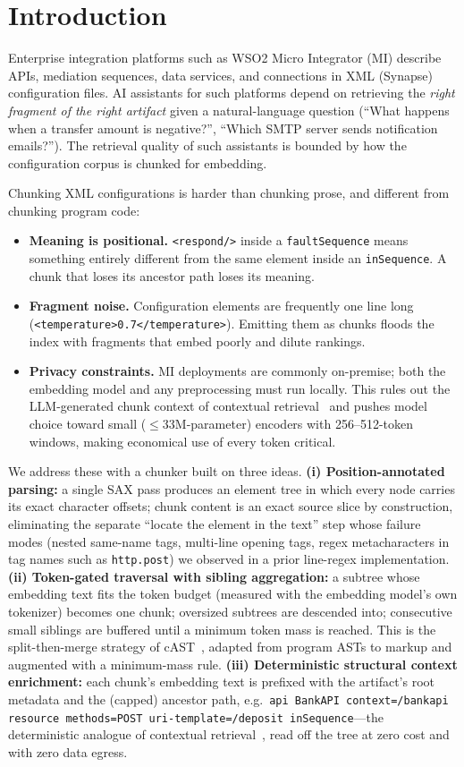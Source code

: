\documentclass[conference]{IEEEtran}
\begin{document}
\section{Introduction}
Enterprise integration platforms such as WSO2 Micro Integrator (MI) describe APIs, mediation sequences, data services, and connections in XML (Synapse) configuration files. AI assistants for such platforms depend on retrieving the \emph{right fragment of the right artifact} given a natural-language question (``What happens when a transfer amount is negative?'', ``Which SMTP server sends notification emails?''). The retrieval quality of such assistants is bounded by how the configuration corpus is chunked for embedding.

Chunking XML configurations is harder than chunking prose, and different from chunking program code:
\begin{itemize}
  \item \textbf{Meaning is positional.} \texttt{<respond/>} inside a \texttt{faultSequence} means something entirely different from the same element inside an \texttt{inSequence}. A chunk that loses its ancestor path loses its meaning.
  \item \textbf{Fragment noise.} Configuration elements are frequently one line long (\texttt{<temperature>0.7</temperature>}). Emitting them as chunks floods the index with fragments that embed poorly and dilute rankings.
  \item \textbf{Privacy constraints.} MI deployments are commonly on-premise; both the embedding model and any preprocessing must run locally. This rules out the LLM-generated chunk context of contextual retrieval~\cite{anthropic2024contextual} and pushes model choice toward small ($\leq$33M-parameter) encoders with 256--512-token windows, making economical use of every token critical.
\end{itemize}

We address these with a chunker built on three ideas. \textbf{(i) Position-annotated parsing:} a single SAX pass produces an element tree in which every node carries its exact character offsets; chunk content is an exact source slice by construction, eliminating the separate ``locate the element in the text'' step whose failure modes (nested same-name tags, multi-line opening tags, regex metacharacters in tag names such as \texttt{http.post}) we observed in a prior line-regex implementation. \textbf{(ii) Token-gated traversal with sibling aggregation:} a subtree whose embedding text fits the token budget (measured with the embedding model's own tokenizer) becomes one chunk; oversized subtrees are descended into; consecutive small siblings are buffered until a minimum token mass is reached. This is the split-then-merge strategy of cAST~\cite{zhang2025cast}, adapted from program ASTs to markup and augmented with a minimum-mass rule. \textbf{(iii) Deterministic structural context enrichment:} each chunk's embedding text is prefixed with the artifact's root metadata and the (capped) ancestor path, e.g.\ \texttt{api BankAPI context=/bankapi resource methods=POST uri-template=/deposit inSequence}---the deterministic analogue of contextual retrieval~\cite{anthropic2024contextual}, read off the tree at zero cost and with zero data egress.
\end{document}
